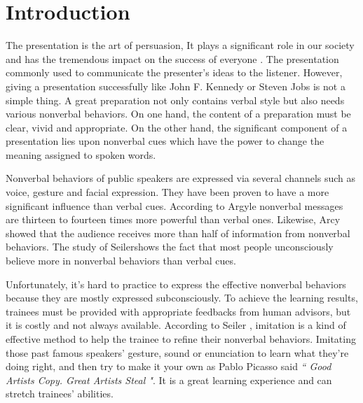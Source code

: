 \chapter{Introduction}
\par The presentation is the art of persuasion, It plays a significant role in our society and has the tremendous impact on the success of everyone \cite{seiler2002communication}. The presentation commonly used to communicate the presenter's ideas to the listener. However, giving a presentation successfully like John F. Kennedy or Steven Jobs is not a simple thing. A great preparation not only contains verbal style but also needs various nonverbal behaviors. On one hand, the content of a preparation must be clear, vivid and appropriate\cite{rodman1996style}. On the other hand, the significant component of a presentation lies upon nonverbal cues which have the power to change the meaning assigned to spoken words\cite{seiler2002communication}. 
\par Nonverbal behaviors of public speakers are expressed via several channels such as voice, gesture and facial expression. They have been proven to have a more significant influence than verbal cues. According to Argyle nonverbal messages are thirteen to fourteen times more powerful than verbal ones\cite{argyle1971communication}. Likewise, Arcy showed that the audience receives more than half of information from nonverbal behaviors\cite{d1998communicating}. The study of Seiler\cite{seiler2002communication}shows the fact that most people unconsciously believe more in nonverbal behaviors than verbal cues.
\par Unfortunately, it's hard to practice to express the effective nonverbal behaviors because they are mostly expressed subconsciously. To achieve the learning results, trainees must be provided with appropriate feedbacks from human advisors, but it is costly and not always available. According to Seiler \cite{seiler2002communication}, imitation is a kind of effective method to help the trainee to refine their nonverbal behaviors. Imitating those past famous speakers' gesture, sound or enunciation to learn what they're doing right, and then try to make it your own as Pablo Picasso said \emph{`` Good Artists Copy. Great Artists Steal "}. It is a great learning experience and can stretch trainees' abilities.

